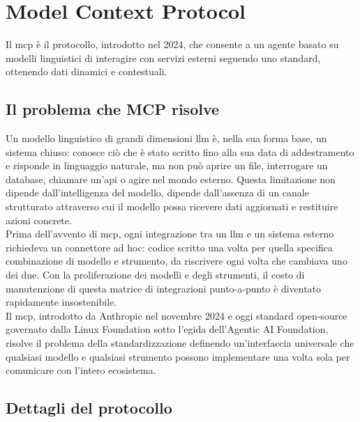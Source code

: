 \section{Model Context Protocol}
\label{sec:mcp-methodology}
Il \gls{mcp} è il protocollo, introdotto nel 2024, che consente a un agente basato su modelli
linguistici di interagire con servizi esterni seguendo uno standard, ottenendo dati dinamici e
contestuali.

\subsection{Il problema che MCP risolve}

Un modello linguistico di grandi dimensioni \gls{llm} è, nella
sua forma base, un sistema chiuso: conosce ciò che è stato scritto fino alla sua data di
addestramento e risponde in linguaggio naturale, ma non può aprire un file, interrogare un
database, chiamare un'\gls{api} o agire nel mondo esterno. Questa limitazione non dipende
dall'intelligenza del modello, dipende dall'assenza di un canale strutturato attraverso
cui il modello possa ricevere dati aggiornati e restituire azioni concrete.\\
Prima dell'avvento di \gls{mcp}, ogni integrazione tra un \gls{llm} e un sistema esterno richiedeva
un connettore ad hoc: codice scritto una volta per quella specifica combinazione di
modello e strumento, da riscrivere ogni volta che cambiava uno dei due. Con la
proliferazione dei modelli e degli strumenti, il costo di manutenzione di questa matrice
di integrazioni punto-a-punto è diventato rapidamente insostenibile.\\
Il \gls{mcp}, introdotto da Anthropic nel novembre 2024 e
oggi standard open-source governato dalla Linux Foundation sotto l'egida dell'Agentic AI
Foundation, risolve il problema della standardizzazione definendo un'interfaccia universale che qualsiasi modello e
qualsiasi strumento possono implementare una volta sola per comunicare con l'intero
ecosistema.

\subsection{Dettagli del protocollo}
\label{sec:mcp-dettagli}

